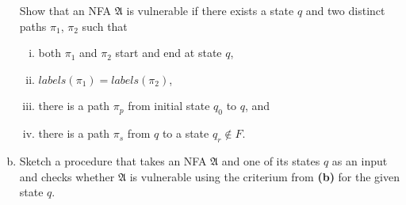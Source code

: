 \begin{exercise}{40}
\begin{enumerate}[(a)]
    Show that an NFA $\mathfrak{A}$ is vulnerable if there exists a state $q$ and two distinct paths $\pi_1$, $\pi_2$ such that
            \begin{enumerate}[(i)]
              \item both $\pi_1$ and $\pi_2$ start and end at state $q$,
              \item $\textit{labels}(\pi_1) = \textit{labels}(\pi_2)$,
              \item there is a path $\pi_p$ from initial state $q_0$ to $q$, and
              \item there is a path $\pi_s$ from $q$ to a state $q_r \notin F$.
            \end{enumerate}
  \item Sketch a procedure that takes an NFA $\mathfrak{A}$ and one of its states $q$ as an input and checks whether $\mathfrak{A}$ is vulnerable using the criterium from \textbf{(b)} for the given state $q$.
  \end{enumerate}
\end{exercise}


